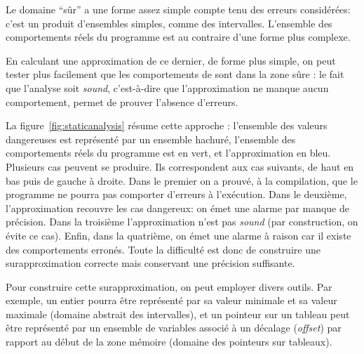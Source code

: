 Le domaine \enquote{sûr} a une forme assez simple compte tenu des erreurs
considérées: c'est un produit d'ensembles simples, comme des intervalles.
L'ensemble des comportements réels du programme est au contraire d'une forme
plus complexe.

En calculant une approximation de ce dernier, de forme plus simple, on peut
tester plus facilement que les comportements de sont dans la zone sûre : le fait
que l'analyse soit \emph{sound}, c'est-à-dire que l'approximation ne manque
aucun comportement, permet de prouver l'absence d'erreurs.

La figure~\ref{fig:staticanalysis} résume cette approche : l'ensemble des
valeurs dangereuses est représenté par un ensemble hachuré, l'ensemble des
comportements réels du programme est en vert, et l'approximation en bleu.
Plusieurs cas peuvent se produire. Ils correspondent aux cas suivants, de haut
en bas puis de gauche à droite. Dans le premier on a prouvé, à la compilation,
que le programme ne pourra pas comporter d'erreurs à l'exécution. Dans le
deuxième, l'approximation recouvre les cas dangereux: on émet une alarme par
manque de précision. Dans la troisième l'approximation n'est pas \emph{sound}
(par construction, on évite ce cas). Enfin, dans la quatrième, on émet une
alarme à raison car il existe des comportements erronés. Toute la difficulté est
donc de construire une surapproximation correcte mais conservant une précision
suffisante.

Pour construire cette surapproximation, on peut employer divers outils. Par
exemple, un entier pourra être représenté par sa valeur minimale et sa valeur
maximale (domaine abstrait des intervalles), et un pointeur sur un tableau peut
être représenté par un ensemble de variables associé à un décalage
(\emph{offset}) par rapport au début de la zone mémoire (domaine des pointeurs
sur tableaux).




